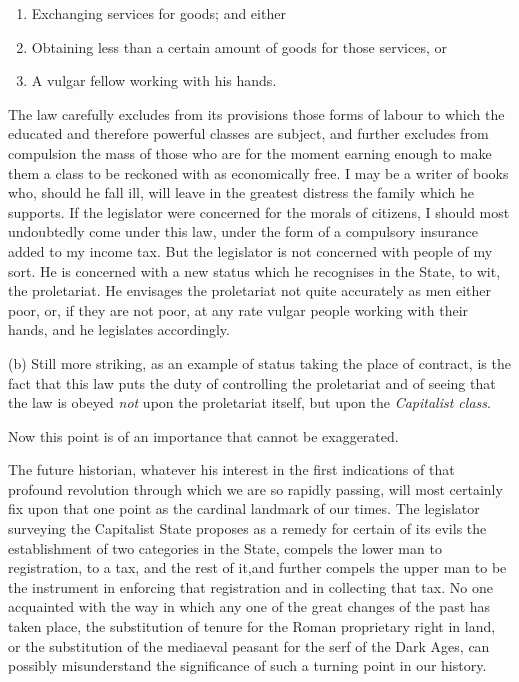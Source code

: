 \documentclass{book}
\begin{document}
\begin{enumerate}
\item Exchanging services for goods; and either


\item Obtaining less than a certain amount of goods for those services, or


\item A vulgar fellow working with his hands.



\end{enumerate}
The law carefully excludes from its provisions those forms of labour to which the educated and therefore powerful classes are subject, and further excludes from compulsion the mass of those who are for the moment earning enough to make them a class to be reckoned with as economically free. I may be a writer of books who, should he fall ill, will leave in the greatest distress the family which he supports. If the legislator were concerned for the morals of citizens, I should most undoubtedly come under this law, under the form of a compulsory insurance added to my income tax. But the legislator is not concerned with people of my sort. He is concerned with a new status which he recognises in the State, to wit, the proletariat. He envisages the proletariat not quite accurately as men either poor, or, if they are not poor, at any rate vulgar people working with their hands, and he legislates accordingly.

(b) Still more striking, as an example of status taking the place of contract, is the fact that this law puts the duty of controlling the proletariat and of seeing that the law is obeyed \emph{not} upon the proletariat itself, but upon the \emph{Capitalist class}.

Now this point is of an importance that cannot be exaggerated.

The future historian, whatever his interest in the first indications of that profound revolution through which we are so rapidly passing, will most certainly fix upon that one point as the cardinal landmark of our times. The legislator surveying the Capitalist State proposes as a remedy for certain of its evils the establishment of two categories in the State, compels the lower man to registration, to a tax, and the rest of it,and further compels the upper man to be the instrument in enforcing that registration and in collecting that tax. No one acquainted with the way in which any one of the great changes of the past has taken place, the substitution of tenure for the Roman proprietary right in land, or the substitution of the mediaeval peasant for the serf of the Dark Ages, can possibly misunderstand the significance of such a turning point in our history.
\end{document}
